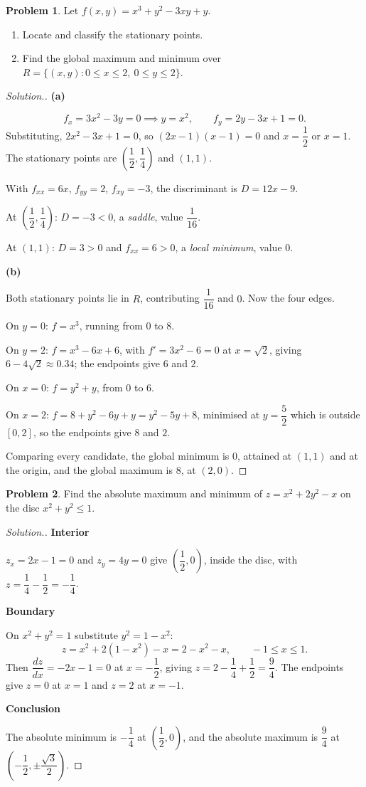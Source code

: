 \documentclass[11pt,a4paper]{article}
\theoremstyle{definition}
\newtheorem{problemx}{Problem}[subsection]
\newenvironment{problem}{\begin{problemx}}{\end{problemx}}
\newenvironment{solution}
  {\renewcommand{\qedsymbol}{}\begin{proof}[\textit{Solution}.]}
  {\end{proof}}
\newcommand{\subhead}[1]{%
  \par\medskip\noindent\textbf{#1}\par\nobreak\smallskip}
\begin{document}
\begin{problem}
Let $f(x,y) = x^3+y^2-3xy+y$.
\begin{enumerate}
\item[(a)] Locate and classify the stationary points.
\item[(b)] Find the global maximum and minimum over
$R = \{(x,y): 0\leq x\leq 2,\ 0\leq y\leq 2\}$.
\end{enumerate}
\end{problem}
\begin{solution}
\subhead{(a)}
\[f_x = 3x^2-3y = 0 \implies y = x^2,\qquad
f_y = 2y-3x+1 = 0 .\]
Substituting, $2x^2-3x+1 = 0$, so $(2x-1)(x-1) = 0$ and
$x = \dfrac12$ or $x = 1$. The stationary points are
$\left(\dfrac12,\dfrac14\right)$ and $(1,1)$.

With $f_{xx} = 6x$, $f_{yy} = 2$, $f_{xy} = -3$, the discriminant is
$D = 12x-9$.

At $\left(\dfrac12,\dfrac14\right)$: $D = -3<0$, a \emph{saddle}, value
$\dfrac{1}{16}$.

At $(1,1)$: $D = 3>0$ and $f_{xx} = 6>0$, a \emph{local minimum}, value $0$.

\subhead{(b)}
Both stationary points lie in $R$, contributing $\dfrac{1}{16}$ and $0$. Now the
four edges.

On $y=0$: $f = x^3$, running from $0$ to $8$.

On $y=2$: $f = x^3-6x+6$, with $f' = 3x^2-6 = 0$ at $x = \sqrt2$, giving
$6-4\sqrt2\approx 0.34$; the endpoints give $6$ and $2$.

On $x=0$: $f = y^2+y$, from $0$ to $6$.

On $x=2$: $f = 8+y^2-6y+y = y^2-5y+8$, minimised at $y = \dfrac52$ which is
outside $[0,2]$, so the endpoints give $8$ and $2$.

Comparing every candidate, the global minimum is $0$, attained at $(1,1)$ and at
the origin, and the global maximum is $8$, at $(2,0)$.
\end{solution}

\begin{problem}
Find the absolute maximum and minimum of $z = x^2+2y^2-x$ on the disc
$x^2+y^2\leq 1$.
\end{problem}
\begin{solution}
\subhead{Interior}
$z_x = 2x-1 = 0$ and $z_y = 4y = 0$ give $\left(\dfrac12, 0\right)$, inside the
disc, with $z = \dfrac14-\dfrac12 = -\dfrac14$.

\subhead{Boundary}
On $x^2+y^2 = 1$ substitute $y^2 = 1-x^2$:
\[z = x^2+2(1-x^2)-x = 2-x^2-x ,\qquad -1\leq x\leq 1 .\]
Then $\dfrac{dz}{dx} = -2x-1 = 0$ at $x = -\dfrac12$, giving
$z = 2-\dfrac14+\dfrac12 = \dfrac94$. The endpoints give $z = 0$ at $x=1$ and
$z = 2$ at $x=-1$.

\subhead{Conclusion}
The absolute minimum is $-\dfrac14$ at $\left(\dfrac12,0\right)$, and the absolute
maximum is $\dfrac94$ at $\left(-\dfrac12, \pm\dfrac{\sqrt3}{2}\right)$.
\end{solution}
\end{document}
